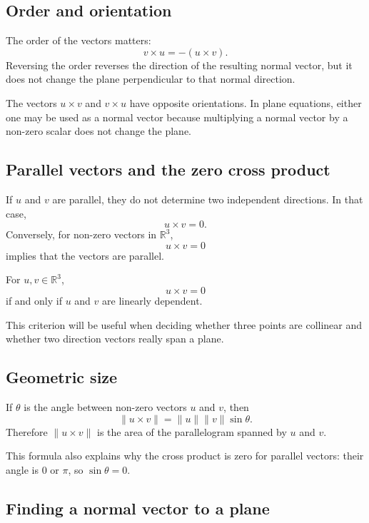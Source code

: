 \subsection*{Order and orientation}

The order of the vectors matters:
\[
v\times u=-(u\times v).
\]
Reversing the order reverses the direction of the resulting normal vector, but it does not change the plane perpendicular to that normal direction.

\begin{remarkbox}
The vectors \(u\times v\) and \(v\times u\) have opposite orientations. In plane equations, either one may be used as a normal vector because multiplying a normal vector by a non-zero scalar does not change the plane.
\end{remarkbox}

\subsection*{Parallel vectors and the zero cross product}

If \(u\) and \(v\) are parallel, they do not determine two independent directions. In that case,
\[
u\times v=0.
\]
Conversely, for non-zero vectors in \(\mathbb{R}^3\),
\[
u\times v=0
\]
implies that the vectors are parallel.

\begin{theorembox}
For \(u,v\in\mathbb{R}^3\),
\[
u\times v=0
\]
if and only if \(u\) and \(v\) are linearly dependent.
\end{theorembox}

This criterion will be useful when deciding whether three points are collinear and whether two direction vectors really span a plane.

\subsection*{Geometric size}

If \(\theta\) is the angle between non-zero vectors \(u\) and \(v\), then
\[
\lVert u\times v\rVert
=
\lVert u\rVert\lVert v\rVert\sin\theta.
\]
Therefore \(\lVert u\times v\rVert\) is the area of the parallelogram spanned by \(u\) and \(v\).

This formula also explains why the cross product is zero for parallel vectors: their angle is \(0\) or \(\pi\), so \(\sin\theta=0\).

\subsection*{Finding a normal vector to a plane}

